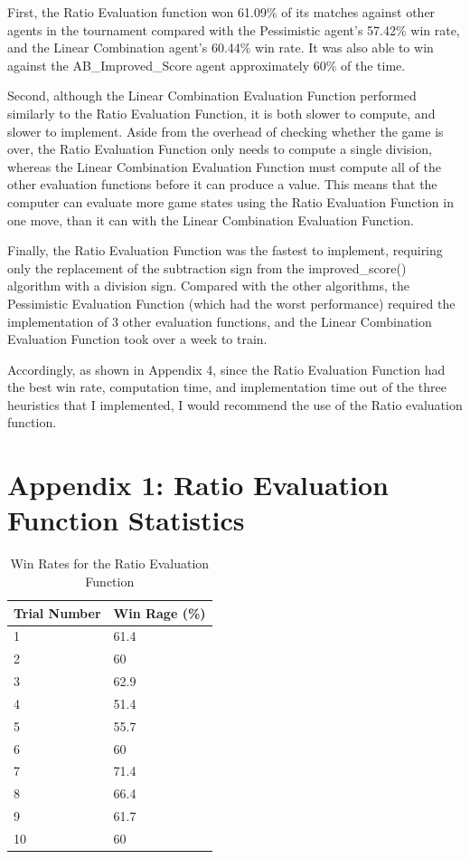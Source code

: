 \documentclass[12pt]{article}
\begin{document}
First, the Ratio Evaluation function won 61.09\% of its matches against other 
agents in the tournament compared with the Pessimistic agent's 57.42\% win rate, 
and the Linear Combination agent's 60.44\% win rate. It was also able to win 
against the AB\_Improved\_Score agent approximately 60\% of the time.

Second, although the Linear Combination Evaluation Function performed similarly 
to the Ratio Evaluation Function, it is both slower to compute, and slower to 
implement. Aside from the overhead of checking whether the game is over, the 
Ratio Evaluation Function only needs to compute a single division, whereas the 
Linear Combination Evaluation Function must compute all of the other evaluation 
functions before it can produce a value. This means that the computer can 
evaluate more game states using the Ratio Evaluation Function in one move, than 
it can with the Linear Combination Evaluation Function.

Finally, the Ratio Evaluation Function was the fastest to implement, requiring 
only the replacement of the subtraction sign from the improved\_score() 
algorithm with a division sign. Compared with the other algorithms, the 
Pessimistic Evaluation Function (which had the worst performance) required the 
implementation of 3 other evaluation functions, and the Linear Combination 
Evaluation Function took over a week to train.

Accordingly, as shown in Appendix 4, since the Ratio Evaluation Function had the 
best win rate, computation time, and implementation time out of the three 
heuristics that I implemented, I would recommend the use of the Ratio evaluation 
function.

\newpage
\section{Appendix 1: Ratio Evaluation Function Statistics}
\begin{table}[h]
\centering
\caption{Win Rates for the Ratio Evaluation Function}
\label{ratio-eval}
\begin{tabular}{@{}|l|l|@{}}
\toprule
Trial Number & Win Rage (\%) \\ \midrule
1            & 61.4          \\ \midrule
2            & 60            \\ \midrule
3            & 62.9          \\ \midrule
4            & 51.4          \\ \midrule
5            & 55.7          \\ \midrule
6            & 60            \\ \midrule
7            & 71.4          \\ \midrule
8            & 66.4          \\ \midrule
9            & 61.7          \\ \midrule
10           & 60            \\ \bottomrule
\end{tabular}
\end{table}
\end{document}
